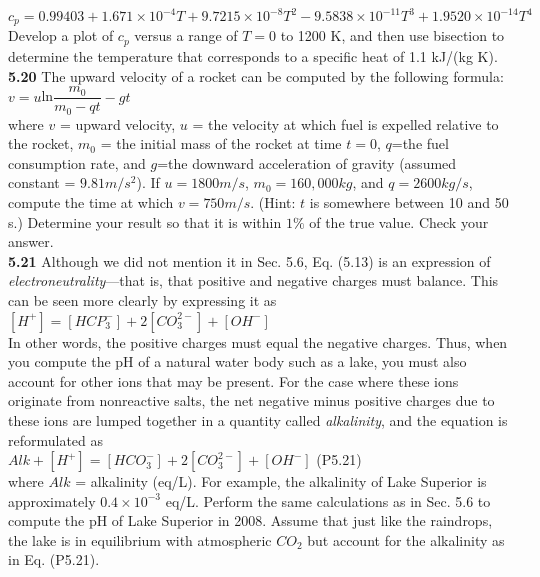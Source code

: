 \documentclass[../main.tex]{subfiles}
\begin{document}
\begin{multicols}{2}
    $c_p = 0.99403 + 1.671 \times 10^{-4}T + 9.7215 \times 10^{-8}T^2 -9.5838\times
    10^{-11}T^3 + 1.9520 \times 10^{-14}T^4$\\

    \noindent Develop a plot of $c_p$ versus a range of $T = 0$ to 1200 K, and
    then use bisection to determine the temperature that corresponds
    to a specific heat of 1.1 kJ/(kg K).\\

    \noindent\textbf{5.20} The upward velocity of a rocket can be computed by
    the following formula:\\

    $v = u$ln$\dfrac{m_0}{m_0-qt}-gt$\\

    \noindent where $v$ = upward velocity, $u$ = the velocity at which fuel is
    expelled relative to the rocket, $m_0$ = the initial mass of the
    rocket at time $t=0$, $q$=the fuel consumption rate, and $g$=the
    downward acceleration of gravity (assumed constant =
    $9.81 m/s^2$). If $u = 1800 m/s$, $m_0 = 160,000 kg$, and $q =
    2600 kg/s$, compute the time at which $v = 750 m/s$. (Hint: $t$
    is somewhere between 10 and 50 s.) Determine your result so
    that it is within $1\%$ of the true value. Check your answer.\\

    \noindent\textbf{5.21} Although we did not mention it in Sec. 5.6, Eq. (5.13) is
    an expression of \emph{electroneutrality}---that is, that positive and
    negative charges must balance. This can be seen more clearly
    by expressing it as\\

    $[H^+]=[HCP^-_3]+2[CO^{2-}_3]+[OH^-]$\\

    \noindent In other words, the positive charges must equal the negative
    charges. Thus, when you compute the pH of a natural water
    body such as a lake, you must also account for other ions that
    may be present. For the case where these ions originate from
    nonreactive salts, the net negative minus positive charges due
    to these ions are lumped together in a quantity called \emph{alkalinity},
    and the equation is reformulated as\\

    \noindent$Alk + [H^+] = [HCO^-_3]+2[CO^{2-}_3]+[OH^-]$
    \hfill (P5.21)\\

    \noindent where $Alk$ = alkalinity (eq/L). For example, the alkalinity of
    Lake Superior is approximately $0.4 \times 10^{-3}$ eq/L. Perform the
    same calculations as in Sec. 5.6 to compute the pH of Lake
    Superior in 2008. Assume that just like the raindrops, the lake
    is in equilibrium with atmospheric $CO_2$ but account for the
    alkalinity as in Eq. (P5.21).\\


\end{multicols}
\end{document}
